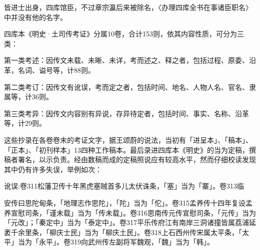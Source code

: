 \vfill
\begin{BookNotes}
\end{BookNotes}

\noindent 皆进士出身，四库馆臣，不过章宗瀛后来被除名，〈办理四库全书在事诸臣职名〉中并没有他的名字。

四库本《明史·土司传考证》分属10卷，合计153则，依其内容性质，可分为三类：

第一类考述：因传文未载、未晰、未详，考而述之、释之者，包括过程、原委、沿革，名词、谥号等，计88则。

第二类考订：因传文有讹误，考而定之者，包括时间、地名、人物人名、官名、隶属等，计36则。

第三类考异：因传文内容别有异说，存异待定者，包括时间、事实、名称、沿革等，计29则。

这些抄录在各卷卷末的考证文字，据王颂蔚的说法，当初有「进呈本」、「稿本」、「正本」、「初刊样本」13四种工作稿本。最后录进四库本《明史》的当为定稿，撰稿者署名，以示负责。经由数稿而成的定稿照说应有较高水平，然而仔细校读发现其中仍有许多失误，举例如次：

讹误:卷311松藩卫传十年黑虎塞贼首多儿太伏诛条，「塞」当为「寨」。卷313临

\begin{BookQuote}
安传曰思陀甸条，「地理志作思陀」，「陀」当为「佗」。卷315孟养传十四年复设孟养宣慰司条，「谨未载」当为「传未载」。卷316思南传元传宣慰司条，「元传」当为「元改」；「秦定中」当为「泰定中」。卷317平乐传府江有南岸三洞诸撞皆属荔浦延袤千余里条，「柳庆士民」当为「柳庆土民」。卷318上石西州传宋属太平条，「太平」当为「永平」。卷319向武州传左副将军魏观，「魏」当为「韩」。
\end{BookQuote}

